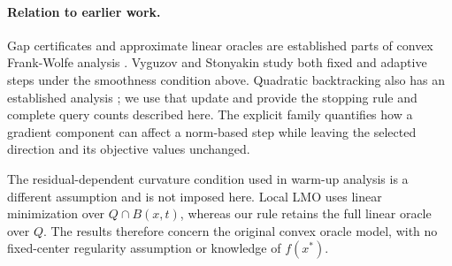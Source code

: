 \paragraph{Relation to earlier work.}
Gap certificates and approximate linear oracles are established parts
of convex Frank-Wolfe analysis \cite{jaggi}. Vyguzov and Stonyakin
\cite{vyguzov} study both fixed and adaptive steps under the smoothness
condition above. Quadratic backtracking also has an established analysis
\cite{pedregosa}; we use that update and provide the stopping rule and
complete query counts described here. The explicit family quantifies
how a gradient component can affect a norm-based step while leaving
the selected direction and its objective values unchanged.

The residual-dependent curvature condition used in warm-up analysis
\cite{warmup} is a different assumption and is not imposed here.
Local LMO \cite{locallmo} uses linear minimization over
$Q\cap B(x,t)$, whereas our rule retains the full linear oracle over $Q$.
The results therefore concern the original convex oracle model, with
no fixed-center regularity assumption or knowledge of $f(x^*)$.
